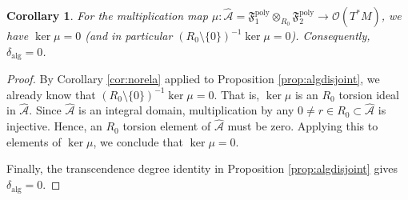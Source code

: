 \documentclass[11pt]{amsart}
\theoremstyle{definition}
\theoremstyle{plain}
\newtheorem{corollary}[theorem]{Corollary}
\theoremstyle{conclusion}
\begin{document}
\begin{corollary}
\label{cor:deltaalgzero}
For the multiplication map $\mu:\widehat{\mathcal{A}} = \mathfrak{F}_1^{\mathrm{poly}}\otimes_{R_0}\mathfrak{F}_2^{\mathrm{poly}}\to\mathcal{O}(T^*M)$, we have  $\ker\mu = 0$ (and in particular $(R_0\setminus\{0\})^{-1}\ker\mu = 0$). Consequently, $\delta_{\mathrm{alg}} = 0$.
\end{corollary}

\begin{proof}
By Corollary \ref{cor:norela} applied to Proposition \ref{prop:algdisjoint}, we already know that $(R_0\setminus\{0\})^{-1}\ker\mu = 0$. That is, $\ker\mu$ is an $R_0$ torsion ideal in $\widehat{\mathcal{A}}$. Since $\widehat{\mathcal{A}}$ is an integral domain, multiplication by any $0\neq r\in R_0\subset \widehat{\mathcal{A}}$ is injective. Hence, an $R_0$ torsion element of $\widehat{\mathcal{A}}$ must be zero. Applying this to elements of $\ker\mu$, we conclude that $\ker\mu=0$.

Finally, the transcendence degree identity in Proposition \ref{prop:algdisjoint} gives $\delta_{\mathrm{alg}}=0$.
\end{proof}



   

\end{document}
